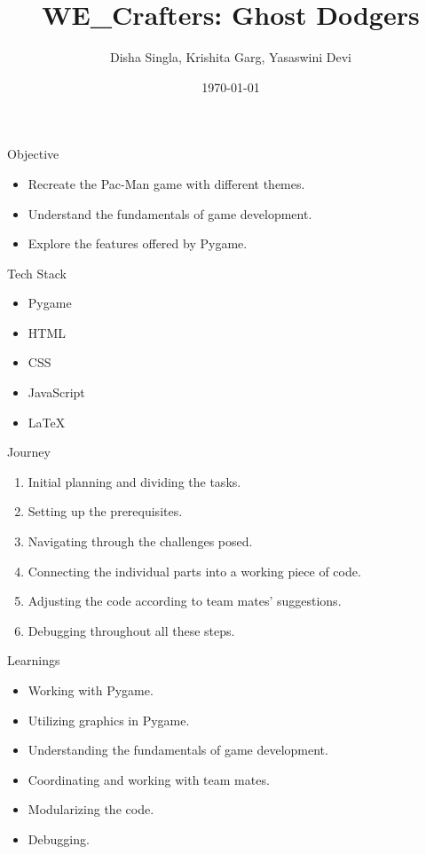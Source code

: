 \documentclass{beamer}
\title{WE\_Crafters: Ghost Dodgers}
\author{Disha Singla, Krishita Garg, Yasaswini Devi}
\date{\today}
\begin{document}
\frame{\titlepage}

\begin{frame}{Objective}
    \begin{itemize}
        \item Recreate the Pac-Man game with different themes.
        \item Understand the fundamentals of game development.
        \item Explore the features offered by Pygame.
    \end{itemize}
\end{frame}

\begin{frame}{Tech Stack}
    \begin{itemize}
        \item Pygame
        \item HTML
        \item CSS
        \item JavaScript
        \item LaTeX
    \end{itemize}
\end{frame}

\begin{frame}{Journey}
    \begin{enumerate}
        \item Initial planning and dividing the tasks.
        \item Setting up the prerequisites.
        \item Navigating through the challenges posed.
        \item Connecting the individual parts into a working piece of code.
        \item Adjusting the code according to team mates' suggestions.
        \item Debugging throughout all these steps.
    \end{enumerate}
\end{frame}

\begin{frame}{Learnings}
    \begin{itemize}
        \item Working with Pygame.
        \item Utilizing graphics in Pygame.
        \item Understanding the fundamentals of game development.
        \item Coordinating and working with team mates.
        \item Modularizing the code.
        \item Debugging.
    \end{itemize}
\end{frame}
\end{document}
